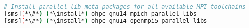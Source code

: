 
\begin{lstlisting}[language=bash,keywords={},upquote=true,keepspaces]
# Install parallel lib meta-packages for all available MPI toolchains
[sms](*\#*) (*\install*) ohpc-gnu14-mpich-parallel-libs
[sms](*\#*) (*\install*) ohpc-gnu14-openmpi5-parallel-libs
\end{lstlisting}
